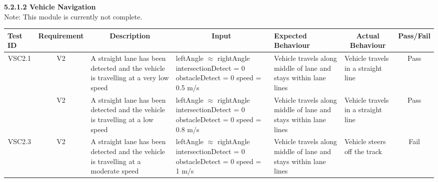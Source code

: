 \documentclass [10pt]{article}
\begin{document}
    
    
    
    
    
    \textbf{5.2.1.2 Vehicle Navigation} \vspace{2mm}\\
    Note: This module is currently not complete. \\
 \begin{longtable}{ | p{ } | p{ } |  p{ } |  p{ } | p{ } | p{ } |  p{ } |}  \hline

    \rowcolor{subsectionC}\textbf{Test ID}  
    & \textbf{Requirement}
    & \multicolumn{1}{c|}{\textbf{Description} }
    & \multicolumn{1}{c|}{\textbf{Input} }
    & \textbf{Expected Behaviour} 
    & \multicolumn{1}{c|}{\textbf{Actual Behaviour}}
    & \textbf{Pass/Fail} \\    \hline
    
    \multicolumn{1}{|c|}{VSC2.1} 
    & \multicolumn{1}{c|}{V2}
    & A straight lane has been detected and the vehicle is travelling at a very low speed
    & leftAngle $\approx$ rightAngle \newline
    intersectionDetect = 0 \newline
    obstacleDetect = 0 \newline
    speed = 0.5 m/s
    & Vehicle travels along middle of lane and stays within lane lines
    & Vehicle travels in a straight line
    & \multicolumn{1}{c|}{Pass}\\ \hline
    
    \rowcolor{tableCell}\multicolumn{1}{|c|}{VSC2.2} 
    & \multicolumn{1}{c|}{V2}
    & A straight lane has been detected and the vehicle is travelling at a low speed
    & leftAngle $\approx$ rightAngle \newline
    intersectionDetect = 0 \newline
    obstacleDetect = 0 \newline
    speed =  0.8 m/s
    & Vehicle travels along middle of lane and stays within lane lines
    & Vehicle travels in a straight line
    & \multicolumn{1}{c|}{Pass}\\ \hline
    
    \multicolumn{1}{|c|}{VSC2.3}
    & \multicolumn{1}{c|}{V2}
    & A straight lane has been detected and the vehicle is travelling at a moderate speed
    & leftAngle $\approx$ rightAngle \newline
    intersectionDetect = 0 \newline
    obstacleDetect = 0 \newline
    speed = 1 m/s
    & Vehicle travels along middle of lane and stays within lane lines
    & Vehicle steers off the track
    & \multicolumn{1}{c|}{Fail}\\\hline
    

\end{longtable}
\end{document}
